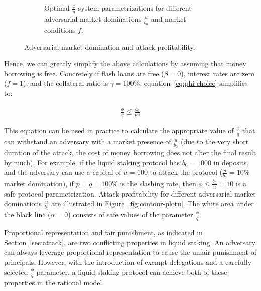 \begin{figure}[htb]
\begin{subfigure}{0.49\textwidth}
    \caption{Optimal $\frac{\phi}{q}$ system parametrizations
             for different adversarial market dominations $\frac{u}{b_0}$
             and market conditions $f$.}
    \label{fig:compare-f-plotu}
  \end{subfigure}
  \caption{Adversarial market domination and attack profitability.}
  \label{fig:plotu}
\end{figure}

Hence, we can greatly simplify the above calculations by assuming that money borrowing is free.
Concretely if flash loans are free ($\beta = 0$), interest rates are zero ($f = 1$),
and the collateral ratio is $\gamma = 100\%$, equation~\eqref{eq:phi-choice} simplifies to:

\begin{gather*}
  \frac{\phi}{q} \leq \frac{b_0}{pu} \label{eq:phi-choice-simple} \tag{$\ast$}
\end{gather*}

This equation can be used in practice to calculate the appropriate value
of $\frac{\phi}{q}$ that can withstand an adversary with a market presence of $\frac{u}{b_0}$
(due to the very short duration of the attack, the cost of money borrowing does not alter
the final result by much).
For example, if the liquid staking protocol has $b_0 = 1000$ \asset in deposits,
and the adversary can use a capital of $u = 100$ \asset to attack the protocol
($\frac{u}{b_0} = 10\%$ market domination),
if $p = q = 100\%$ is the slashing rate, then $\phi \leq \frac{b_0}{u} = 10$
is a safe protocol parametrization. Attack profitability for different adversarial
market dominations $\frac{u}{b_0}$ are illustrated in Figure~\ref{fig:contour-plotu}.
The white area under the black line ($\alpha = 0$) consists of safe values
of the parameter $\frac{\phi}{q}$.

Proportional representation and fair punishment, as indicated in
Section~\ref{sec:attack}, are two conflicting properties in liquid
staking. An adversary can always leverage proportional
representation to cause the unfair punishment of principals.
However, with the introduction of exempt delegations and a carefully selected
$\frac{\phi}{q}$ parameter, a liquid staking protocol can achieve both of these
properties in the rational model.

